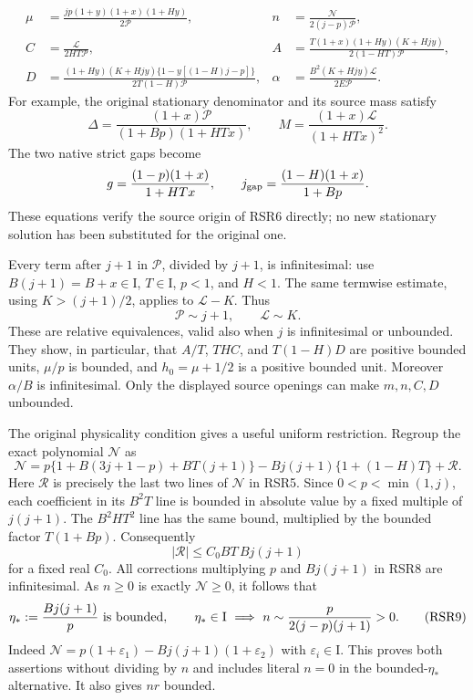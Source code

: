 \[
\begin{aligned}
 \mu&=\frac{jp(1+y)(1+x)(1+Hy)}{2\mathcal P},&
 n&=\frac{\mathcal N}{2(j-p)\mathcal P},\\
 C&=\frac{\mathcal L}{2HT\mathcal P},&
 A&=\frac{T(1+x)(1+Hy)(K+Hjy)}{2(1-HT)\mathcal P},\\
 D&=\frac{(1+Hy)(K+Hjy)\{1-y[(1-H)j-p]\}}
             {2T(1-H)\mathcal P},&
 \alpha&=\frac{B^2(K+Hjy)\mathcal L}{2E\mathcal P}.
\end{aligned}
 \tag{RSR6}
\]
For example, the original stationary denominator and its source mass
satisfy
\[
 \Delta=\frac{(1+x)\mathcal P}{(1+Bp)(1+HTx)},\qquad
 M=\frac{(1+x)\mathcal L}{(1+HTx)^2}.
\]
The two native strict gaps become
\[
 g=\frac{(1-p)(1+x)}{1+HTx},\qquad
 j_{\rm gap}=\frac{(1-H)(1+x)}{1+Bp}.
\]
These equations verify the source origin of RSR6 directly; no new
stationary solution has been substituted for the original one.

Every term after $j+1$ in $\mathcal P$, divided by $j+1$, is
infinitesimal: use $B(j+1)=B+x\in\mathrm I$, $T\in\mathrm I$,
$p<1$, and $H<1$. The same termwise estimate, using
$K>(j+1)/2$, applies to $\mathcal L-K$. Thus
\[
 \mathcal P\sim j+1,\qquad \mathcal L\sim K.
 \tag{RSR7}
\]
These are relative equivalences, valid also when $j$ is infinitesimal
or unbounded. They show, in particular, that $A/T$, $THC$, and
$T(1-H)D$ are positive bounded units, $\mu/p$ is bounded, and
$h_0=\mu+1/2$ is a positive bounded unit. Moreover $\alpha/B$ is
infinitesimal. Only the displayed source openings can make $m,n,C,D$
unbounded.

The original physicality condition gives a useful uniform restriction.
Regroup the exact polynomial $\mathcal N$ as
\[
\mathcal N=p\{1+B(3j+1-p)+BT(j+1)\}
 -Bj(j+1)\{1+(1-H)T\}+\mathcal R.
 \tag{RSR8}
\]
Here $\mathcal R$ is precisely the last two lines of $\mathcal N$
in RSR5. Since $0<p<\min(1,j)$, each coefficient in its $B^2T$
line is bounded in absolute value by a fixed multiple of $j(j+1)$.
The $B^2HT^2$ line has the same bound, multiplied by the bounded
factor $T(1+Bp)$. Consequently
\[
 |\mathcal R|\leq C_0BT\,Bj(j+1)
\]
for a fixed real $C_0$. All corrections multiplying $p$ and
$Bj(j+1)$ in RSR8 are infinitesimal. As $n\geq0$ is exactly
$\mathcal N\geq0$, it follows that
\[
 \eta_*:=\frac{Bj(j+1)}p\ \hbox{is bounded},\qquad
 \eta_*\in\mathrm I\ \Longrightarrow\
 n\sim\frac{p}{2(j-p)(j+1)}>0.
 \tag{RSR9}
\]
Indeed $\mathcal N=p(1+\varepsilon_1)-Bj(j+1)(1+\varepsilon_2)$
with $\varepsilon_i\in\mathrm I$. This proves both assertions without
dividing by $n$ and includes literal $n=0$ in the bounded-$\eta_*$
alternative. It also gives $nr$ bounded.

